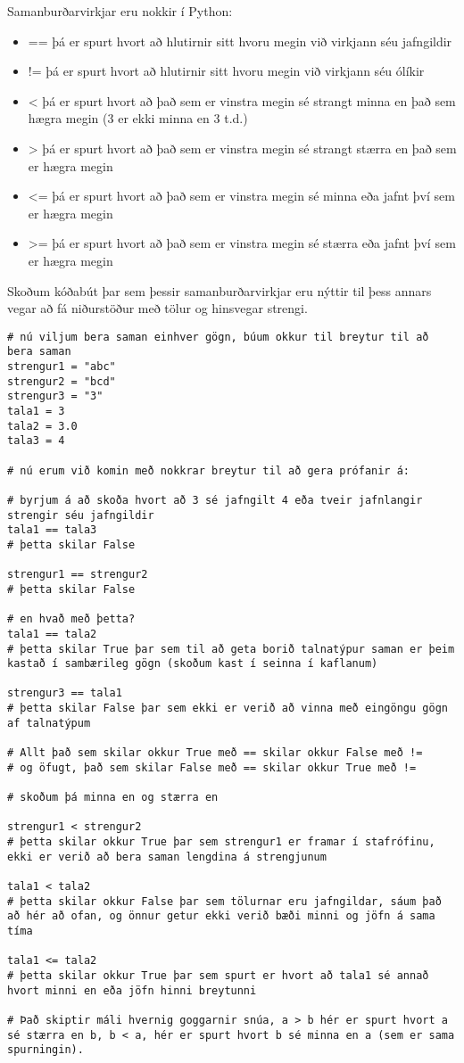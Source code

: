 Samanburðarvirkjar eru nokkir í Python:
\begin{itemize}
	\item == þá er spurt hvort að hlutirnir sitt hvoru megin við virkjann séu jafngildir
	\item != þá er spurt hvort að hlutirnir sitt hvoru megin við virkjann séu ólíkir
	\item < þá er spurt hvort að það sem er vinstra megin sé strangt minna en það sem hægra megin (3 er ekki minna en 3 t.d.)
	\item > þá er spurt hvort að það sem er vinstra megin sé strangt stærra en það sem er hægra megin
	\item <= þá er spurt hvort að það sem er vinstra megin sé minna eða jafnt því sem er hægra megin
	\item >= þá er spurt hvort að það sem er vinstra megin sé stærra eða jafnt því sem er hægra megin
\end{itemize}

Skoðum kóðabút þar sem þessir samanburðarvirkjar eru nýttir til þess annars vegar að fá niðurstöður með tölur og hinsvegar strengi.
\begin{lstlisting}[caption=Samanburðarvirkjar, label=lst:bool-samanburður]
# nú viljum bera saman einhver gögn, búum okkur til breytur til að bera saman
strengur1 = "abc"
strengur2 = "bcd"
strengur3 = "3"
tala1 = 3
tala2 = 3.0
tala3 = 4

# nú erum við komin með nokkrar breytur til að gera prófanir á:

# byrjum á að skoða hvort að 3 sé jafngilt 4 eða tveir jafnlangir strengir séu jafngildir
tala1 == tala3 
# þetta skilar False

strengur1 == strengur2
# þetta skilar False

# en hvað með þetta?
tala1 == tala2
# þetta skilar True þar sem til að geta borið talnatýpur saman er þeim kastað í sambærileg gögn (skoðum kast í seinna í kaflanum)

strengur3 == tala1 
# þetta skilar False þar sem ekki er verið að vinna með eingöngu gögn af talnatýpum

# Allt það sem skilar okkur True með == skilar okkur False með != 
# og öfugt, það sem skilar False með == skilar okkur True með !=

# skoðum þá minna en og stærra en

strengur1 < strengur2
# þetta skilar okkur True þar sem strengur1 er framar í stafrófinu, ekki er verið að bera saman lengdina á strengjunum

tala1 < tala2
# þetta skilar okkur False þar sem tölurnar eru jafngildar, sáum það að hér að ofan, og önnur getur ekki verið bæði minni og jöfn á sama tíma

tala1 <= tala2
# þetta skilar okkur True þar sem spurt er hvort að tala1 sé annað hvort minni en eða jöfn hinni breytunni

# Það skiptir máli hvernig goggarnir snúa, a > b hér er spurt hvort a sé stærra en b, b < a, hér er spurt hvort b sé minna en a (sem er sama spurningin).
\end{lstlisting}

